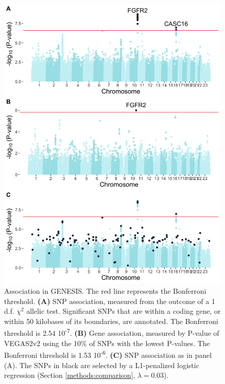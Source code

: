 \documentclass[twocolumn, 10pt]{article}
\begin{document}
\begin{figure}[htbp]
  \centering
  \includegraphics[width=.9\linewidth]{./figures/sfigure_2.png}
  \caption{\label{sfig:snp_gene_manhattan} Association in GENESIS. The red line represents the Bonferroni threshold. \textbf{(A)} SNP association, measured from the outcome of a 1 d.f. $\chi^2$ allelic test. Significant SNPs that are within a coding gene, or within 50 kilobases of its boundaries, are annotated. The Bonferroni threshold is 2.54 \texttimes{} 10\textsuperscript{-7}. \textbf{(B)} Gene association, measured by P-value of VEGAS2v2 \cite{mishra_vegas2:_2015} using the 10\% of SNPs with the lowest P-values. The Bonferroni threshold is 1.53 \texttimes{} 10\textsuperscript{-6}. \textbf{(C)} SNP association as in panel (A). The SNPs in black are selected by a L1-penalized logistic regression (Section \ref{methods:comparison}, $\lambda = 0.03$).}
\end{figure}
\end{document}
